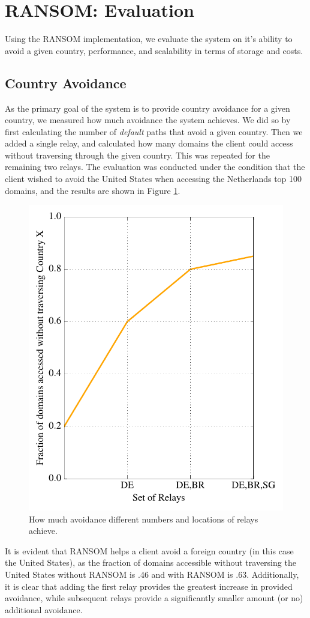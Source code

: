 \section{RANSOM: Evaluation}
Using the RANSOM implementation, we evaluate the system on it's ability to avoid a given country, performance, and scalability in terms of storage and costs.

\subsection{Country Avoidance}
As the primary goal of the system is to provide country avoidance for a given 
country, we measured how much avoidance the system achieves.  We did so by first 
calculating the number of {\it default} paths that avoid a given country.  Then 
we added a single relay, and calculated how many domains the client could 
access without traversing through the given country.  This was repeated for 
the remaining two relays.  The evaluation was conducted under the condition that 
the client wished to avoid the United States when accessing the Netherlands top 
100 domains, and the results are shown in Figure \ref{fig:avoidance_eval}.

\begin{figure}[b!]
\centering
\includegraphics[width=.5\textwidth]{avoidance_n_relays}
\caption{How much avoidance different numbers and locations of relays achieve.}
\label{fig:avoidance_eval}
\end{figure}

It is evident that RANSOM helps a client avoid a foreign country (in this case 
the United States), as the fraction of domains accessible without traversing 
the United States without RANSOM is .46 and with RANSOM is .63.  Additionally, 
it is clear that adding the first relay provides the greatest increase in 
provided avoidance, while subsequent relays provide a significantly 
smaller amount (or no) additional avoidance.

